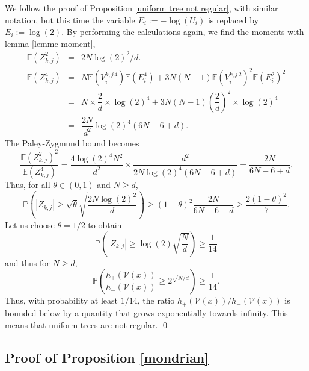 \documentclass[paper=a4, fontsize=11pt]{scrartcl}
\newcommand{\PP}{\mathbb{P}}
\begin{document}
We follow the proof of Proposition \ref{uniform tree not regular}, with similar notation, but this time the variable $E_i := -\log(U_i)$ is replaced by $E_i := \log(2)$. By performing the calculations again, we find the moments with lemma \ref{lemme moment},
\begin{eqnarray*}
    \mathbb{E}(Z_{k,j}^2) &=& 2N \log(2)^2/d. \\
    \mathbb{E}(Z_{k,j}^4) &=& N \mathbb{E}({V_i^{k,j \, 4}}) \mathbb{E}(E_i^4) + 3N (N-1) \mathbb{E}({V_i^{k,j \, 2}})^2 \mathbb{E}(E_i^2)^2 \\ &=& N \times \dfrac{2}{d} \times  \log(2)^4 + 3N(N-1) \left( \dfrac{2}{d}\right)^2 \times \log(2)^4 \\ &=& \dfrac{2N}{d^2} \log(2)^4 (6N - 6 + d).
\end{eqnarray*}
The Paley-Zygmund bound becomes
\[
\frac{\mathbb{E}(Z_{k,j}^2)^2}{\mathbb{E}(Z_{k,j}^4)} = \frac{4 \log(2)^4 N^2}{d^2} \times \frac{d^2}{2N \log(2)^4 (6N - 6 + d) }= \frac{2N}{6N - 6 + d}.
\]
Thus, for all \(\theta \in (0,1)\) and $N \geq d$,
\[
\PP\left(|Z_{k,j}| \geq \sqrt{\theta} \sqrt{\frac{2N \log(2)^2}{d}}\right) \geq (1-\theta)^2 \frac{2N}{6N - 6 + d} \geq \dfrac{2(1-\theta)^2}{7}.
\]
Let us choose \(\theta = 1/2\) to obtain
\[
\PP\left(|Z_{k,j}| \geq \log(2) \sqrt{\frac{N}{d}}\right) \geq \dfrac{1}{14}
\]
and thus for $N \geq d$,
\[
\PP\left(\dfrac{h_+(\mathcal V (x))}{h_-(\mathcal V (x))} \geq 2^{\sqrt{{N}/{d}}} \right) \geq \frac{1}{14}.
\]
Thus, with probability at least $1/14$, the ratio ${h_+(\mathcal V (x))}/{h_-(\mathcal V (x))} $ is bounded below by a quantity that grows exponentially towards infinity. This means that uniform trees are not regular.
\qed

\subsection*{Proof of Proposition \ref{mondrian}}
\end{document}
